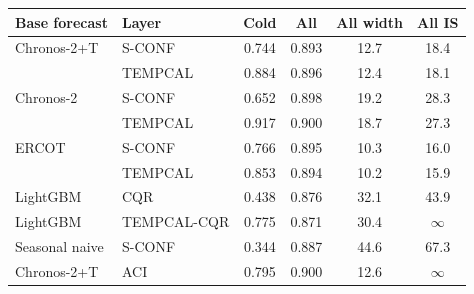\begin{tabular}{@{}llcccc@{}}
\toprule
Base forecast & Layer & Cold & All & All width & All IS \\
\midrule
Chronos-2+T & S-CONF & 0.744 & 0.893 & 12.7 & 18.4 \\
 & TEMPCAL & 0.884 & 0.896 & 12.4 & 18.1 \\
Chronos-2 & S-CONF & 0.652 & 0.898 & 19.2 & 28.3 \\
 & TEMPCAL & 0.917 & 0.900 & 18.7 & 27.3 \\
ERCOT & S-CONF & 0.766 & 0.895 & 10.3 & 16.0 \\
 & TEMPCAL & 0.853 & 0.894 & 10.2 & 15.9 \\
LightGBM & CQR & 0.438 & 0.876 & 32.1 & 43.9 \\
LightGBM & TEMPCAL-CQR & 0.775 & 0.871 & 30.4 & $\infty$ \\
Seasonal naive & S-CONF & 0.344 & 0.887 & 44.6 & 67.3 \\
Chronos-2+T & ACI & 0.795 & 0.900 & 12.6 & $\infty$ \\
\bottomrule
\end{tabular}
